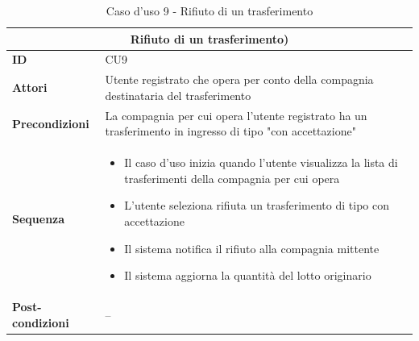 \documentclass[a4paper,11pt]{article}
\begin{document}
\begin{table}[H]
  \centering
  \begin{tabular}{|m{2cm}|m{10.5cm}|}
    \hline
    \multicolumn{2}{|c|}{\textbf{Rifiuto di un trasferimento)}} \\ \hline
    \multicolumn{1}{|l|}{\textbf{ID}}              & CU9        \\ \hline
    \multicolumn{1}{|l|}{\textbf{Attori}}          &

    Utente registrato che opera per conto della compagnia destinataria del trasferimento

    \\ \hline
    \multicolumn{1}{|l|}{\textbf{Precondizioni}}   &
    La compagnia per cui opera l'utente registrato ha un trasferimento in ingresso di tipo "con accettazione"
    \\ \hline
    \multicolumn{1}{|l|}{\textbf{Sequenza}}        &

    \begin{itemize}
      \item Il caso d'uso inizia quando l'utente visualizza la lista di trasferimenti della compagnia per cui opera
      \item L'utente seleziona rifiuta un trasferimento di tipo con accettazione
      \item Il sistema notifica il rifiuto alla compagnia mittente
      \item Il sistema aggiorna la quantità del lotto originario
    \end{itemize}

    \\ \hline
    \multicolumn{1}{|l|}{\textbf{Post-condizioni}} & --         \\ \hline
  \end{tabular}
  \caption{Caso d'uso 9 - Rifiuto di un trasferimento}
  \label{cu:CU9}
\end{table}
\end{document}
